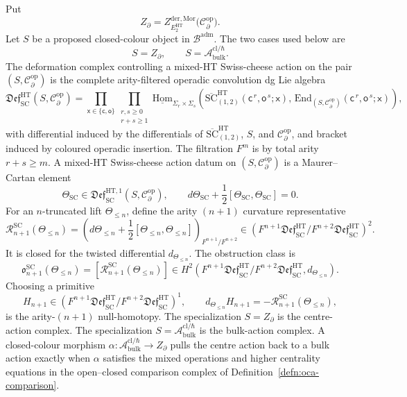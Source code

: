 \begin{defn}
\label{defn:sc-ht-action-datum}
Put
\[
  Z_\partial=
  Z^{\mathrm{der},\mathrm{Mor}}_{E_2^{\mathrm{HT}}}\!
  \bigl(\mathcal C^{\mathrm{op}}_\partial\bigr).
\]
Let \(S\) be a proposed closed-colour object in
\(\mathcal B^{\mathrm{adm}}\).  The two cases used below are
\[
  S=Z_\partial,\qquad
  S=\mathcal A^{\mathrm{cl}/\hbar}_{\mathrm{bulk}} .
\]
The deformation complex controlling a mixed-HT Swiss-cheese action on
the pair \((S,\mathcal C^{\mathrm{op}}_\partial)\) is the complete
arity-filtered operadic convolution dg Lie algebra
\[
  \mathfrak{Def}^{\mathrm{HT}}_{\mathrm{SC}}
  (S,\mathcal C^{\mathrm{op}}_\partial)
  =
  \prod_{\mathsf x\in\{\mathsf c,\mathsf o\}}
  \prod_{\substack{r,s\ge0\\ r+s\ge1}}
  \underline{\mathrm{Hom}}_{\Sigma_r\times\Sigma_s}\!\left(
    \overline{\mathrm{SC}}^{\mathrm{HT}}_{(1,2)}
    (\mathsf c^{\,r},\mathsf o^{\,s};\mathsf x),\,
    \mathrm{End}_{(S,\mathcal C^{\mathrm{op}}_\partial)}
    (\mathsf c^{\,r},\mathsf o^{\,s};\mathsf x)\right),
\]
with differential induced by the differentials of
\(\overline{\mathrm{SC}}^{\mathrm{HT}}_{(1,2)}\),
\(S\), and \(\mathcal C^{\mathrm{op}}_\partial\), and bracket
induced by coloured operadic insertion.  The filtration \(F^m\) is by
total arity \(r+s\ge m\).  A mixed-HT Swiss-cheese action datum on
\((S,\mathcal C^{\mathrm{op}}_\partial)\) is a Maurer--Cartan element
\[
  \Theta_{\mathrm{SC}}\in
  \mathfrak{Def}^{\mathrm{HT},1}_{\mathrm{SC}}
  (S,\mathcal C^{\mathrm{op}}_\partial),
  \qquad
  d\Theta_{\mathrm{SC}}+
  \frac12[\Theta_{\mathrm{SC}},\Theta_{\mathrm{SC}}]=0 .
\]
For an \(n\)-truncated lift \(\Theta_{\le n}\), define the arity
\((n+1)\) curvature representative
\[
  \mathcal R^{\mathrm{SC}}_{n+1}(\Theta_{\le n})
  =
  \left(d\Theta_{\le n}+\frac12[\Theta_{\le n},\Theta_{\le n}]\right)_
  {F^{n+1}/F^{n+2}}
  \in
  \left(
    F^{n+1}\mathfrak{Def}^{\mathrm{HT}}_{\mathrm{SC}}/
    F^{n+2}\mathfrak{Def}^{\mathrm{HT}}_{\mathrm{SC}}
  \right)^2 .
\]
It is closed for the twisted differential \(d_{\Theta_{\le n}}\).  The
obstruction class is
\[
  \mathfrak o^{\mathrm{SC}}_{n+1}(\Theta_{\le n})
  =
  [\mathcal R^{\mathrm{SC}}_{n+1}(\Theta_{\le n})]
  \in
  H^2\!\left(
    F^{n+1}\mathfrak{Def}^{\mathrm{HT}}_{\mathrm{SC}}/
    F^{n+2}\mathfrak{Def}^{\mathrm{HT}}_{\mathrm{SC}},
    d_{\Theta_{\le n}}\right).
\]
Choosing a primitive
\[
  H_{n+1}\in
  \left(F^{n+1}\mathfrak{Def}^{\mathrm{HT}}_{\mathrm{SC}}/
  F^{n+2}\mathfrak{Def}^{\mathrm{HT}}_{\mathrm{SC}}\right)^1,
  \qquad
  d_{\Theta_{\le n}}H_{n+1}
  =-\mathcal R^{\mathrm{SC}}_{n+1}(\Theta_{\le n}),
\]
is the arity-\((n+1)\) null-homotopy.
The specialization \(S=Z_\partial\) is the centre-action complex.  The
specialization
\(S=\mathcal A^{\mathrm{cl}/\hbar}_{\mathrm{bulk}}\) is the bulk-action
complex.  A closed-colour morphism
\(\alpha\colon\mathcal A^{\mathrm{cl}/\hbar}_{\mathrm{bulk}}\to
Z_\partial\) pulls the centre action back to a bulk action exactly when
\(\alpha\) satisfies the mixed operations and higher centrality equations
in the open--closed comparison complex of
Definition~\ref{defn:oca-comparison}.
\end{defn}

